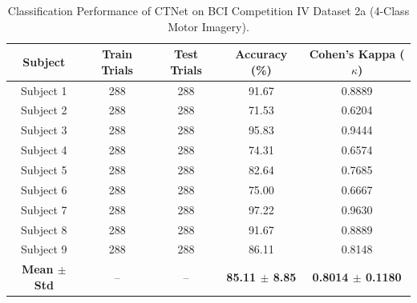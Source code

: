 \begin{table}[htbp]
  \centering
  \caption{Classification Performance of CTNet on BCI Competition IV Dataset 2a (4-Class Motor Imagery).}
  \label{tab:bci_results}
  \begin{tabular}{ccccc}
    \toprule
    \textbf{Subject} & \textbf{Train Trials} & \textbf{Test Trials} & \textbf{Accuracy (\%)} & \textbf{Cohen's Kappa ($\kappa$)} \\
    \midrule
    Subject 1 & 288 & 288 & 91.67 & 0.8889 \\
    Subject 2 & 288 & 288 & 71.53 & 0.6204 \\
    Subject 3 & 288 & 288 & 95.83 & 0.9444 \\
    Subject 4 & 288 & 288 & 74.31 & 0.6574 \\
    Subject 5 & 288 & 288 & 82.64 & 0.7685 \\
    Subject 6 & 288 & 288 & 75.00 & 0.6667 \\
    Subject 7 & 288 & 288 & 97.22 & 0.9630 \\
    Subject 8 & 288 & 288 & 91.67 & 0.8889 \\
    Subject 9 & 288 & 288 & 86.11 & 0.8148 \\
    \midrule
    \textbf{Mean $\pm$ Std} & -- & -- & \textbf{85.11 $\pm$ 8.85} & \textbf{0.8014 $\pm$ 0.1180} \\
    \bottomrule
  \end{tabular}
\end{table}